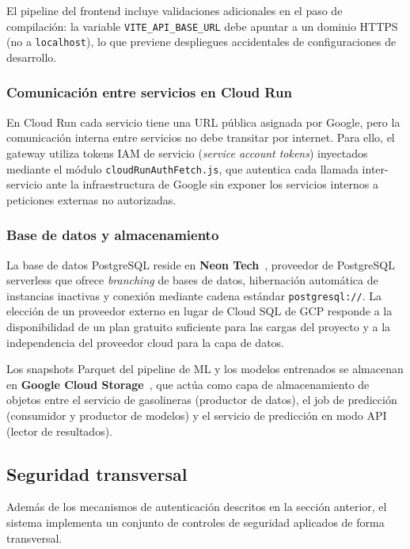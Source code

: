 El pipeline del frontend incluye validaciones adicionales en el paso de compilación: la
variable \texttt{VITE\_API\_BASE\_URL} debe apuntar a un dominio HTTPS (no a
\texttt{localhost}), lo que previene despliegues accidentales de configuraciones de
desarrollo.

\subsubsection*{Comunicación entre servicios en Cloud Run}

En Cloud Run cada servicio tiene una URL pública asignada por Google, pero la comunicación
interna entre servicios no debe transitar por internet. Para ello, el gateway utiliza
tokens IAM de servicio (\textit{service account tokens}) inyectados mediante el módulo
\texttt{cloudRunAuthFetch.js}, que autentica cada llamada inter-servicio ante la
infraestructura de Google sin exponer los servicios internos a peticiones externas no
autorizadas.

\subsubsection*{Base de datos y almacenamiento}

La base de datos PostgreSQL reside en \textbf{Neon Tech}~\cite{neon_tech2026}, proveedor de
PostgreSQL serverless que ofrece \textit{branching} de bases de datos, hibernación
automática de instancias inactivas y conexión mediante cadena estándar
\texttt{postgresql://}. La elección de un proveedor externo en lugar de Cloud SQL de GCP
responde a la disponibilidad de un plan gratuito suficiente para las cargas del proyecto
y a la independencia del proveedor cloud para la capa de datos.

Los snapshots Parquet del pipeline de ML y los modelos entrenados se almacenan en
\textbf{Google Cloud Storage}~\cite{cloud_storage2026}, que actúa como capa de almacenamiento de objetos
entre el servicio de gasolineras (productor de datos), el job de predicción (consumidor y
productor de modelos) y el servicio de predicción en modo API (lector de resultados).

\subsection{Seguridad transversal}
\label{subsec:seguridad_impl}

Además de los mecanismos de autenticación descritos en la sección anterior, el sistema
implementa un conjunto de controles de seguridad aplicados de forma transversal.


